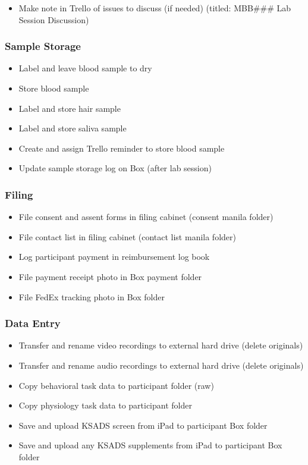 \documentclass[]{book}
\providecommand{\tightlist}{%
  \setlength{\itemsep}{0pt}\setlength{\parskip}{0pt}}
\begin{document}
\begin{itemize}
\tightlist
\item
  Make note in Trello of issues to discuss (if needed) (titled: MBB\#\#\# Lab Session Discussion)
\end{itemize}

\hypertarget{sample-storage}{%
\subsubsection{Sample Storage}\label{sample-storage}}

\begin{itemize}
\tightlist
\item
  Label and leave blood sample to dry
\item
  Store blood sample
\item
  Label and store hair sample
\item
  Label and store saliva sample
\item
  Create and assign Trello reminder to store blood sample
\item
  Update sample storage log on Box (after lab session)
\end{itemize}

\hypertarget{filing}{%
\subsubsection{Filing}\label{filing}}

\begin{itemize}
\tightlist
\item
  File consent and assent forms in filing cabinet (consent manila folder)
\item
  File contact list in filing cabinet (contact list manila folder)
\item
  Log participant payment in reimbursement log book
\item
  File payment receipt photo in Box payment folder
\item
  File FedEx tracking photo in Box folder
\end{itemize}

\hypertarget{data-entry}{%
\subsubsection{Data Entry}\label{data-entry}}

\begin{itemize}
\tightlist
\item
  Transfer and rename video recordings to external hard drive (delete originals)
\item
  Transfer and rename audio recordings to external hard drive (delete originals)
\item
  Copy behavioral task data to participant folder (raw)
\item
  Copy physiology task data to participant folder
\item
  Save and upload KSADS screen from iPad to participant Box folder
\item
  Save and upload any KSADS supplements from iPad to participant Box folder
\end{itemize}
\end{document}
